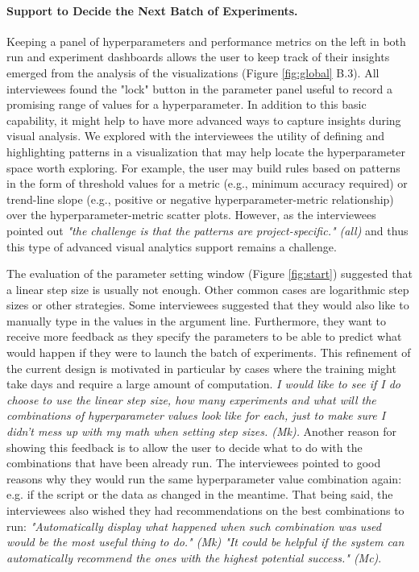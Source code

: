 \documentclass[preprint]{vgtc}        %
\begin{document}
\paragraph{Support to Decide the Next Batch of Experiments.} Keeping a panel of hyperparameters and performance metrics on the left in both run and experiment dashboards allows the user to keep track of their insights emerged from the analysis of the visualizations (Figure \ref{fig:global} B.3). All interviewees found the "lock" button in the parameter panel useful to record a promising range of values for a hyperparameter. In addition to this basic capability, it might help to have more advanced ways to capture insights during visual analysis. We explored with the interviewees the utility of defining and highlighting patterns in a visualization that may help locate the hyperparameter space worth exploring. For example, the user may build rules based on patterns in the form of threshold values for a metric (e.g., minimum accuracy required) or trend-line slope (e.g., positive or negative hyperparameter-metric relationship) over the hyperparameter-metric scatter plots. However, as the interviewees pointed out \textit{"the challenge is that the patterns are project-specific." (all)} and thus this type of advanced visual analytics support remains a challenge.

The evaluation of the parameter setting window (Figure \ref{fig:start}) suggested that a linear step size is usually not enough. Other common cases are logarithmic step sizes or other strategies. Some interviewees suggested that they would also like to manually type in the values in the argument line. Furthermore, they want to receive more feedback as they specify the parameters to be able to predict what would happen if they were to launch the batch of experiments. This refinement of the current design is motivated in particular by cases where the training might take days and require a large amount of computation. \textit{I would like to see if I do choose to use the linear step size, how many experiments and what will the combinations of hyperparameter values look like for each, just to make sure I didn't mess up with my math when setting step sizes. (Mk).} Another reason for showing this feedback is to allow the user to decide what to do with the combinations that have been already run. The interviewees pointed to good reasons why they would run the same hyperparameter value combination again: e.g. if the script or the data as changed in the meantime. That being said, the interviewees also wished they had recommendations on the best combinations to run: \textit{"Automatically display what happened when such combination was used would be the most useful thing to do." (Mk) "It could be helpful if the system can automatically recommend the ones with the highest potential success." (Mc)}. 
\end{document}
